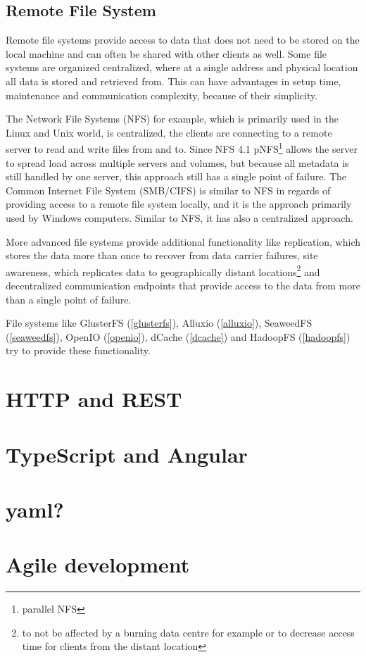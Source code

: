 \subsection{Remote File System}
\label{analysis:storage:organisation}

Remote file systems provide access to data that does not need to be stored on the local machine and can often be shared with other clients as well.
Some file systems are organized centralized, where at a single address and physical location all data is stored and retrieved from.
This can have advantages in setup time, maintenance and communication complexity, because of their simplicity.

The Network File Systems (NFS) for example, which is primarily used in the Linux and Unix world, is centralized, the clients are connecting to a remote server to read and write files from and to.
Since NFS 4.1 pNFS\footnote{parallel NFS}\cite[p. 14, section 1.7.2.2]{nfs:pnfs} allows the server to spread load across multiple servers and volumes, but because all metadata is still handled by one server, this approach still has a single point of failure.
The Common Internet File System (SMB/CIFS) is similar to NFS in regards of providing access to a remote file system locally, and it is the approach primarily used by Windows computers.
Similar to NFS, it has also a centralized approach.


More advanced file systems provide additional functionality like replication, which stores the data more than once to recover from data carrier failures, site awareness, which replicates data to geographically distant locations\footnote{to not be affected by a burning data centre for example or to decrease access time for clients from the distant location} and decentralized communication endpoints that provide access to the data from more than a single point of failure.


File systems like GlusterFS (\autoref{glusterfs}), Alluxio (\autoref{alluxio}), SeaweedFS (\autoref{seaweedfs}), OpenIO (\autoref{openio}), dCache (\autoref{dcache}) and HadoopFS (\autoref{hadoopfs}) try to provide these functionality.

\section{HTTP and REST}

\section{TypeScript and Angular}


\section{yaml?}


\section{Agile development}

